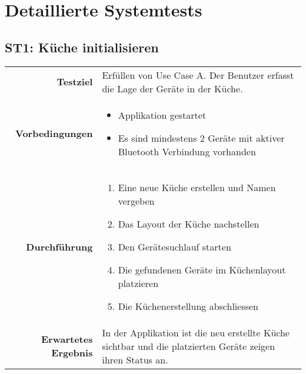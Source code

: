 \section{Detaillierte Systemtests}
\label{sec:DetaillierteSystemtests}

\subsection{ST1: Küche initialisieren}
\begin{table}[H]
\begin{tabularx}{\textwidth}{r X }
\textbf{Testziel} & Erfüllen von Use Case A. Der Benutzer erfasst die Lage der Geräte in der Küche. \\
\textbf{Vorbedingungen} & \begin{itemize}
\item Applikation gestartet
\item Es sind mindestens 2 Geräte mit aktiver Bluetooth Verbindung vorhanden
\end{itemize} \\
\textbf{Durchführung} & \begin{enumerate}
\item Eine neue Küche erstellen und Namen vergeben
\item Das Layout der Küche nachstellen
\item Den Gerätesuchlauf starten
\item Die gefundenen Geräte im Küchenlayout platzieren
\item Die Küchenerstellung abschliessen
\end{enumerate} \\
\textbf{Erwartetes Ergebnis} & In der Applikation ist die neu erstellte Küche sichtbar und die platzierten Geräte zeigen ihren Status an.\\
\end{tabularx}
\end{table}

